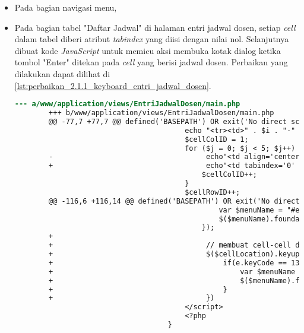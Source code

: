 \begin{itemize}
    \item Pada bagian navigasi menu,
    \item Pada bagian tabel "Daftar Jadwal" di halaman entri jadwal dosen, setiap \textit{cell} dalam tabel diberi atribut \textit{tabindex} yang diisi dengan nilai nol. Selanjutnya dibuat kode \textit{JavaScript} untuk memicu aksi membuka kotak dialog ketika tombol "Enter" ditekan pada \textit{cell} yang berisi jadwal dosen. Perbaikan yang dilakukan dapat dilihat di \ref{lst:perbaikan_2.1.1_keyboard_entri_jadwal_dosen}.
    \begin{lstlisting}[frame=single, label={lst:perbaikan_2.1.1_keyboard_entri_jadwal_dosen}, language=diff, caption=Perbaikan Kriteria Sukses 2.1.1 - Penggunaan \textit{Keyboard} pada Halaman Entri Jadwal Dosen]
        --- a/www/application/views/EntriJadwalDosen/main.php
        +++ b/www/application/views/EntriJadwalDosen/main.php
        @@ -77,7 +77,7 @@ defined('BASEPATH') OR exit('No direct script access allowed');
                                        echo "<tr><td>" . $i . "-" . ($i + 1);
                                        $cellColID = 1;
                                        for ($j = 0; $j < 5; $j++) {
        -                                    echo"<td align='center' id='cell" . $cellRowID . "-" . $cellColID . "'>" . "</td>";
        +                                    echo"<td tabindex='0' align='center' id='cell" . $cellRowID . "-" . $cellColID . "'>" . "</td>";
                                            $cellColID++;
                                        }
                                        $cellRowID++;
        @@ -116,6 +116,14 @@ defined('BASEPATH') OR exit('No direct script access allowed');
                                                var $menuName = "#edit_menu<?php echo $dataHariIni->id ?>";
                                                $($menuName).foundation('open');
                                            });
        +
        +                                    // membuat cell-cell dalam tabel dapat diakses menggunakan keyboard
        +                                    $($cellLocation).keyup(function(e){
        +                                        if(e.keyCode == 13){
        +                                            var $menuName = "#edit_menu<?php echo $dataHariIni->id ?>";
        +                                            $($menuName).foundation('open');
        +                                        }
        +                                    })
                                        </script>
                                        <?php
                                    }
    \end{lstlisting}
\end{itemize}


